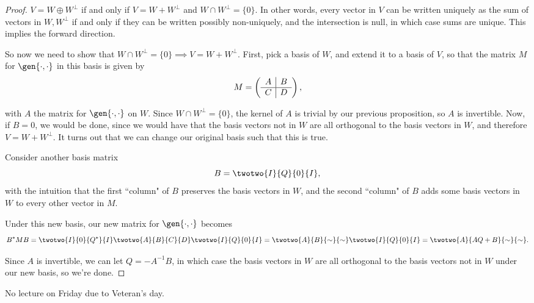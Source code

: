 \begin{proof}
$V = W\oplus W^{\perp}$ if and only if $V = W+W^{\perp}$ and $W\cap W^{\perp} = \{0\}$. In other words, every vector in $V$ can be written uniquely as the sum of vectors in $W, W^{\perp}$ if and only if they can be written possibly non-uniquely, and the intersection is null, in which case sums are unique. This implies the forward direction.

So now we need to show that $W\cap W^{\perp} = \{0\}\implies V=W+W^{\perp}$. First, pick a basis of $W$, and extend it to a basis of $V$, so that the matrix $M$ for $\gen{\cdot, \cdot}$ in this basis is given by
\[M = \left(\begin{array}{ c | c }
    A & B \\
    \hline
    C & D
  \end{array}\right),\]
  
with $A$ the matrix for $\gen{\cdot, \cdot}$ on $W$. Since $W\cap W^{\perp} = \{0\}$, the kernel of $A$ is trivial by our previous proposition, so $A$ is invertible. Now, if $B = 0$, we would be done, since we would have that the basis vectors not in $W$ are all orthogonal to the basis vectors in $W$, and therefore $V = W+W^{\perp}$. It turns out that we can change our original basis such that this is true. 

Consider another basis matrix 
\[B = \twotwo{I}{Q}{0}{I},\]
with the intuition that the first ``column" of $B$ preserves the basis vectors in $W$, and the second ``column" of $B$ adds some basis vectors in $W$ to every other vector in $M$. 

Under this new basis, our new matrix for $\gen{\cdot, \cdot}$ becomes 
\[B^*MB = \twotwo{I}{0}{Q^*}{I}\twotwo{A}{B}{C}{D}\twotwo{I}{Q}{0}{I} = \twotwo{A}{B}{\sim}{\sim}\twotwo{I}{Q}{0}{I} = \twotwo{A}{AQ+B}{\sim}{\sim}.\]

Since $A$ is invertible, we can let $Q=-A^{-1}B$, in which case the basis vectors in $W$ are all orthogonal to the basis vectors not in $W$ under our new basis, so we're done. 
\end{proof}

No lecture on Friday due to Veteran's day.


